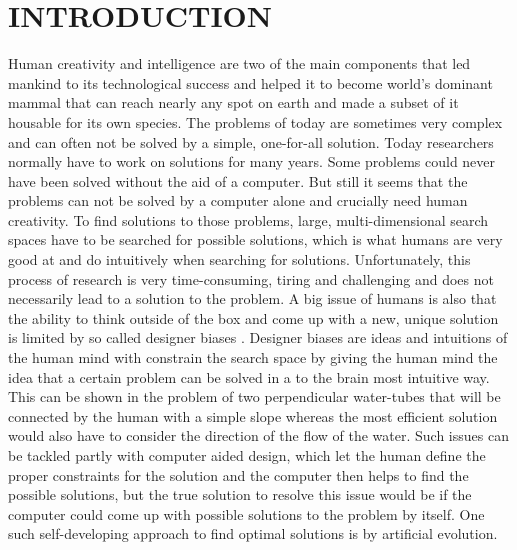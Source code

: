 \documentclass[letterpaper, 10 pt, conference]{ieeeconf}  %
\begin{document}
\section{INTRODUCTION}
Human creativity and intelligence are two of the main components that led mankind to its technological success and helped it to become world's dominant mammal that can reach nearly any spot on earth and made a subset of it housable for its own species. The problems of today are sometimes very complex and can often not be solved by a simple, one-for-all solution. Today researchers normally have to work on solutions for many years. Some problems could never have been solved without the aid of a computer. But still it seems that the problems can not be solved by a computer alone and crucially need human creativity. To find solutions to those problems, large, multi-dimensional search spaces have to be searched for possible solutions, which is what humans are very good at and do intuitively when searching for solutions. Unfortunately, this process of research is very time-consuming, tiring and challenging and does not necessarily lead to a solution to the problem. A big issue of humans is also that the ability to think outside of the box and come up with a new, unique solution is limited by so called designer biases \cite{Pfeifer2006}. Designer biases are ideas and intuitions of the human mind with constrain the search space by giving the human mind the idea that a certain problem can be solved in a to the brain most intuitive way. This can be shown in the problem of two perpendicular water-tubes that will be connected by the human with a simple slope whereas the most efficient solution would also have to consider the direction of the flow of the water. Such issues can be tackled partly with computer aided design, which let the human define the proper constraints for the solution and the computer then helps to find the possible solutions, but the true solution to resolve this issue would be if the computer could come up with possible solutions to the problem by itself. One such self-developing approach to find optimal solutions is by artificial evolution.
\end{document}
